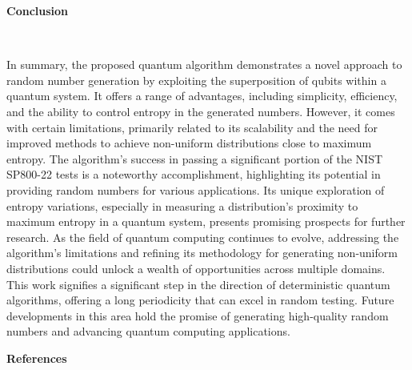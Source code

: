 \documentclass[12pt]{article}
\begin{document}
	   			{\raggedright\large\textbf{Conclusion}}\\\par
	   			{In summary, the proposed quantum algorithm demonstrates a novel approach to random number generation by exploiting the
	   				superposition of qubits within a quantum system. It offers a range of advantages, including simplicity, efficiency, and the ability
	   				to control entropy in the generated numbers. However, it comes with certain limitations, primarily related to its scalability and
	   				the need for improved methods to achieve non-uniform distributions close to maximum entropy.
	   				The algorithm’s success in passing a significant portion of the NIST SP800-22 tests is a noteworthy accomplishment,
	   				highlighting its potential in providing random numbers for various applications. Its unique exploration of entropy variations,
	   				especially in measuring a distribution’s proximity to maximum entropy in a quantum system, presents promising prospects for
	   				further research. As the field of quantum computing continues to evolve, addressing the algorithm’s limitations and refining its methodology
	   				for generating non-uniform distributions could unlock a wealth of opportunities across multiple domains. This work signifies
	   				a significant step in the direction of deterministic quantum algorithms, offering a long periodicity that can excel in random
	   				testing. Future developments in this area hold the promise of generating high-quality random numbers and advancing quantum
	   				computing applications.}\newpage
	   				
	   			{\raggedright\large\textbf{References}}\\
	   			\printbibliography
	   			
\end{document}
